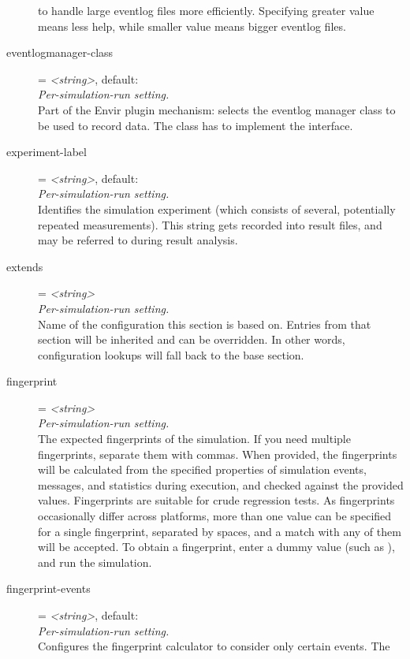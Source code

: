 \begin{description}
    to handle large eventlog files more efficiently. Specifying greater value
    means less help, while smaller value means bigger eventlog files.
\item[eventlogmanager-class] = \textit{<string>}, default: \\
    \textit{Per-simulation-run setting.}\\
    Part of the Envir plugin mechanism: selects the eventlog manager class to
    be used to record data. The class has to implement the
     interface.
\item[experiment-label] = \textit{<string>}, default: \\
    \textit{Per-simulation-run setting.}\\
    Identifies the simulation experiment (which consists of several,
    potentially repeated measurements). This string gets recorded into result
    files, and may be referred to during result analysis.
\item[extends] = \textit{<string>}\\
    \textit{Per-simulation-run setting.}\\
    Name of the configuration this section is based on. Entries from that
    section will be inherited and can be overridden. In other words,
    configuration lookups will fall back to the base section.
\item[fingerprint] = \textit{<string>}\\
    \textit{Per-simulation-run setting.}\\
    The expected fingerprints of the simulation. If you need multiple
    fingerprints, separate them with commas. When provided, the fingerprints
    will be calculated from the specified properties of simulation events,
    messages, and statistics during execution, and checked against the provided
    values. Fingerprints are suitable for crude regression tests. As
    fingerprints occasionally differ across platforms, more than one value can
    be specified for a single fingerprint, separated by spaces, and a match
    with any of them will be accepted. To obtain a fingerprint, enter a dummy
    value (such as ), and run the simulation.
\item[fingerprint-events] = \textit{<string>}, default: \ttt{*}\\
    \textit{Per-simulation-run setting.}\\
    Configures the fingerprint calculator to consider only certain events. The

\end{description}
